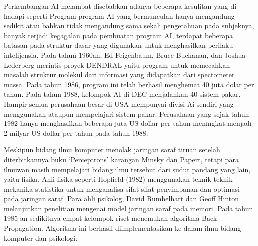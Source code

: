Perkembangan AI melambat disebabkan adanya beberapa kesulitan yang di hadapi seperti  Program-program AI yang bermunculan hanya mengandung sedikit atau bahkan tidak mengandung sama sekali pengetahuan pada subjeknya, banyak terjadi kegagalan pada pembuatan program AI, terdapat beberapa batasan pada struktur dasar yang digunakan untuk menghasilkan perilaku intelijensia. Pada tahun 1960an, Ed Feigenbaum, Bruce Buchanan, dan Joshua Lederberg merintis proyek DENDRAL yaitu program untuk memecahkan masalah struktur molekul dari informasi yang didapatkan dari spectometer massa. Pada tahun 1986, program ini telah berhasil menghemat 40 juta dolar per tahun. Pada tahun 1988, kelompok AI di DEC menjalankan 40 sistem pakar. Hampir semua perusahaan besar di USA mempunyai divisi Ai sendiri yang menggunakan ataupun mempelajari sistem pakar. Perusahaan yang sejak tahun 1982 hanya menghasilkan beberapa juta US dollar per tahun meningkat menjadi 2 milyar US dollar per tahun pada tahun 1988.

Meskipun bidang ilmu komputer menolak jaringan saraf tiruan setelah diterbitkannya buku ‘Perceptrons’ karangan Minsky dan Papert, tetapi para ilmuwan masih mempelajari bidang ilmu tersebut dari sudut pandang yang lain, yaitu fisika. Ahli fisika seperti Hopfield (1982) menggunakan teknik-teknik mekanika statistika untuk menganalisa sifat-sifat penyimpanan dan optimasi pada jaringan saraf. Para ahli psikolog, David Rumhelhart dan Geoff Hinton melanjutkan penelitian mengenai model jaringan saraf pada memori. Pada tahun 1985-an sedikitnya empat kelompok riset menemukan algoritma Back-Propagation. Algoritma ini berhasil diimplementasikan ke dalam ilmu bidang komputer dan psikologi.


